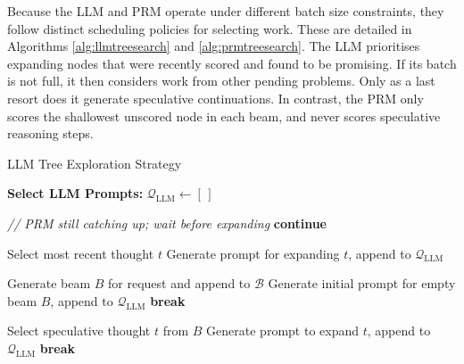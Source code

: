 \documentclass[11pt,twoside]{report}
\begin{document}
Because the LLM and PRM operate under different batch size constraints, they follow distinct scheduling policies for selecting work. 
These are detailed in Algorithms \ref{alg:llmtreesearch} and \ref{alg:prmtreesearch}. 
The LLM prioritises expanding nodes that were recently scored and found to be promising. 
If its batch is not full, it then considers work from other pending problems. 
Only as a last resort does it generate speculative continuations. 
In contrast, the PRM only scores the shallowest unscored node in each beam, and never scores speculative reasoning steps.

\begin{algorithm}[H]\label{alg:llmtreesearch}
\caption{LLM Tree Exploration Strategy}
\begin{algorithmic}[1]
\Statex \textbf{Select LLM Prompts:}
\State $\mathcal{Q}_{\text{LLM}} \gets [\,]$


 
      \State \textit{// PRM still catching up; wait before expanding}
      \State \textbf{continue}
  \EndIf

  \State Select most recent thought $t$
  \State Generate prompt for expanding $t$, append to $\mathcal{Q}_{\text{LLM}}$
\EndFor

     
      \State Generate beam $B$ for request and append to $\mathcal{B}$
      \State Generate initial prompt for empty beam $B$, append to  $\mathcal{Q}_{\text{LLM}}$
          \State \textbf{break}
      \EndIf
    \EndFor
\EndIf

     
            \State Select speculative thought $t$ from $B$
            \State Generate prompt to expand $t$, append to $\mathcal{Q}_{\text{LLM}}$
                \State \textbf{break}
            \EndIf
        \EndIf
    \EndFor
\EndIf
\end{algorithmic}
\end{algorithm}
\end{document}
